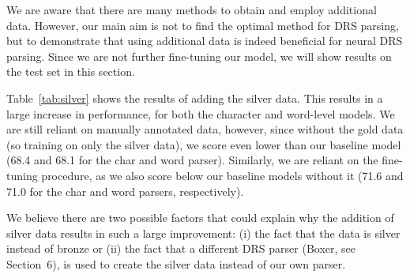 \documentclass[11pt,a4paper]{article}
\begin{document}
We are aware that there are many methods to obtain and employ additional data. However, our main aim is not to find the optimal method for DRS parsing, but to demonstrate that using additional data is indeed beneficial for neural DRS parsing. Since we are not further fine-tuning our model, we will show results on the test set in this section.

\begin{table}[!t]
\centering
{}
\caption{F1-score and percentage of ill-formed DRSs on the test set, for the experiments with the PMB-released silver data. The scores without using an ensemble are an average of five runs of the model.}
\label{tab:silver}
\end{table}


Table~\ref{tab:silver} shows the results of adding the silver data. 
This results in a large increase in performance, for both the character and word-level models. 
We are still reliant on manually annotated data, however, since without the gold data (so training on only the silver data), we score even lower than our baseline model (68.4 and 68.1 for the char and word parser). Similarly, we are reliant on the fine-tuning procedure, as we also score below our baseline models without it (71.6 and 71.0 for the char and word parsers, respectively).

We believe there are two possible factors that could explain why the addition of silver data results in such a large improvement: (i) the fact that the data is silver instead of bronze or (ii) the fact that a different DRS parser (Boxer, see Section~6), is used to create the silver data instead of our own parser. 
\end{document}
